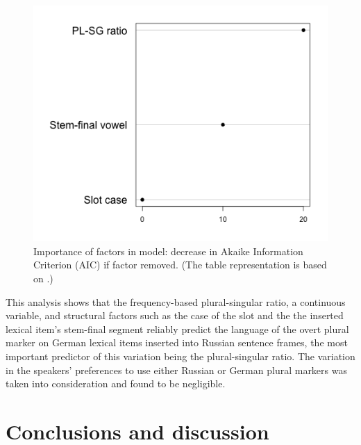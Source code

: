 \begin{figure}
\includegraphics[scale=0.5]{figures/6-Figure_5.png}
\caption{Importance of factors in model: decrease in Akaike Information Criterion (AIC) if factor removed. (The table representation is based on \citealt{szmrecsanyi-2013}.)\label{fig:6:5}}
\end{figure}

This analysis shows that the frequency-based plural-singular ratio, a continuous variable, and structural factors such as the case of the slot and the the inserted lexical item’s stem-final segment  reliably predict the language of the overt plural marker on German lexical items inserted into Russian sentence frames, the most important predictor of this variation being the plural-singular ratio. The variation in the speakers' preferences to use either Russian or German plural markers was taken into consideration and found to be negligible.

\section{Conclusions and discussion}\label{sec:conclusions}


